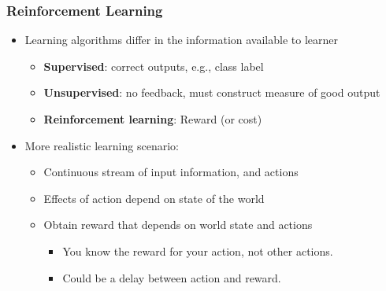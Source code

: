 \documentclass[handout]{beamer}
\renewcommand{\high}{\textbf}
\begin{document}
\begin{frame}\frametitle{Reinforcement Learning}\small
\begin{itemize}
\item Learning algorithms differ in the information available to learner
\begin{itemize}
\setlength\itemsep{1em}
\item \high{Supervised}: correct outputs, e.g., class label
\item \high{Unsupervised}: no feedback, must construct measure of good output
\item \high{Reinforcement learning}: Reward (or cost)
\end{itemize}
\item More realistic learning scenario: 
\begin{itemize}
\setlength\itemsep{1em}
\item Continuous stream of input information, and actions\\[0.7mm] 
\item Effects of action depend on state of the world\\[0.7mm] 
\item Obtain reward that depends on world state and actions\\[0.7mm] 
\begin{itemize}
\item You know the reward for your action, not other actions.
\item Could be a delay between action and reward.
\end{itemize}
\end{itemize}
\end{itemize}
\end{frame}
\end{document}
